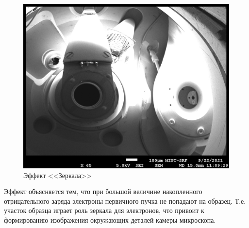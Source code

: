 \documentclass[a4paper,12pt]{article}
\theoremstyle{plain} %
\theoremstyle{definition} %
\theoremstyle{remark} %
\begin{document}
\begin{figure}[h!]
	\centering
	\includegraphics[scale=1]{pic16.jpg}
	\caption{Эффект <<Зеркала>>}
	\label{pic16}
\end{figure}


Эффект объясняется тем, что при большой величине накопленного отрицательного заряда электроны первичного пучка не попадают на образец. Т.е. участок образца играет роль зеркала для электронов, что привоит к формированию изображения окружающих деталей камеры микроскопа.






	
	
\end{document}
